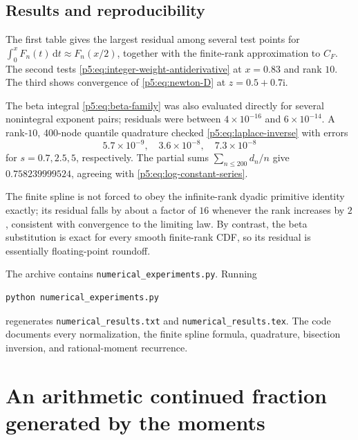 \documentclass[11pt,oneside]{article}
\theoremstyle{definition}
\theoremstyle{remark}
\newcommand{\dd}{\,\mathrm d}
\newcommand{\ii}{\mathrm i}
\newcommand{\1}{\mathbf 1}
\begin{document}
\subsection{Results and reproducibility}

The first table gives the largest residual among several test points for
$\int_0^xF_n(t)\dd t\approx F_n(x/2)$, together with the finite-rank approximation to $C_F$.  The second tests \eqref{p5:eq:integer-weight-antiderivative} at $x=0.83$ and rank $10$.  The third shows convergence of \eqref{p5:eq:newton-D} at $z=0.5+0.7\ii$.

\begin{center}

\end{center}

The beta integral \eqref{p5:eq:beta-family} was also evaluated directly for several nonintegral exponent pairs; residuals were between $4\times10^{-16}$ and $6\times10^{-14}$.  A rank-$10$, 400-node quantile quadrature checked \eqref{p5:eq:laplace-inverse} with errors
\begin{equation}
 5.7\times10^{-9},\quad3.6\times10^{-8},\quad7.3\times10^{-8}
\end{equation}
for $s=0.7,2.5,5$, respectively.  The partial sums
$\sum_{n\le200}d_n/n$ give $0.758239999524$, agreeing with \eqref{p5:eq:log-constant-series}.

The finite spline is not forced to obey the infinite-rank dyadic primitive identity exactly; its residual falls by about a factor of $16$ whenever the rank increases by $2$, consistent with convergence to the limiting law.  By contrast, the beta substitution is exact for every smooth finite-rank CDF, so its residual is essentially floating-point roundoff.

The archive contains \texttt{numerical\_experiments.py}.  Running
\begin{lstlisting}[language=bash]
python numerical_experiments.py
\end{lstlisting}
regenerates \texttt{numerical\_results.txt} and
\texttt{numerical\_results.tex}.  The code documents every normalization, the finite spline formula, quadrature, bisection inversion, and rational-moment recurrence.

\section{An arithmetic continued fraction generated by the moments}
\end{document}
